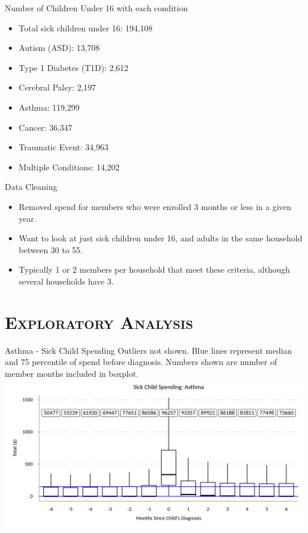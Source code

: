 \documentclass[xcolor=x11names,compress]{beamer}
\renewcommand{\(}{\begin{columns}}
\renewcommand{\)}{\end{columns}}
\newcommand{\<}[1]{\begin{column}{#1}}
\renewcommand{\>}{\end{column}}
\begin{document}
\begin{frame}{Number of Children Under 16 with each condition}
\begin{itemize}
	\item Total sick children under 16: 194,108
	\item Autism (ASD): 13,708 
	\item Type 1 Diabetes (T1D): 2,612
	\item Cerebral Palsy: 2,197
	\item Asthma: 119,299
	\item Cancer: 36,347
	\item Traumatic Event: 34,963
	\item Multiple Conditions: 14,202
\end{itemize}	
\end{frame}

\begin{frame}{Data Cleaning }
\begin{itemize}
	\item Removed spend for members who were enrolled 3 months or less in a given year. 
	\item Want to look at just sick children under 16, and adults in the same household between 30 to 55. 
	\item Typically 1 or 2 members per household that meet these criteria, although several households have 3. 
\end{itemize}
\end{frame}

\section{\scshape Exploratory Analysis}

\begin{frame}{Asthma - Sick Child Spending}
\small
Outliers not shown. Blue lines represent median and 75 percentile of spend before diagnosis. Numbers
shown are number of member months included in boxplot. 
\includegraphics[width=\linewidth]{../figures/sick_child_spend_Asthma.png}
\end{frame}
\end{document}
